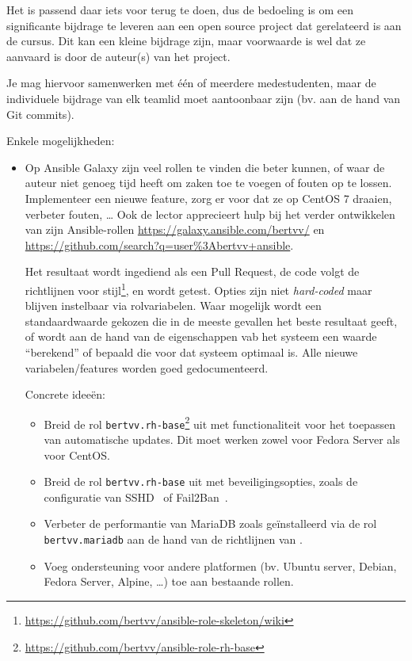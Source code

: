 Het is passend daar iets voor terug te doen, dus de bedoeling is om een significante bijdrage te leveren aan een open source project dat gerelateerd is aan de cursus. Dit kan een kleine bijdrage zijn, maar voorwaarde is wel dat ze aanvaard is door de auteur(s) van het project.

Je mag hiervoor samenwerken met één of meerdere medestudenten, maar de individuele bijdrage van elk teamlid moet aantoonbaar zijn (bv. aan de hand van Git commits).

Enkele mogelijkheden:

\begin{itemize}
\item Op Ansible Galaxy zijn veel rollen te vinden die beter kunnen, of waar de auteur niet genoeg tijd heeft om zaken toe te voegen of fouten op te lossen. Implementeer een nieuwe feature, zorg er voor dat ze op CentOS 7 draaien, verbeter fouten, \ldots{} Ook de lector apprecieert hulp bij het verder ontwikkelen van zijn Ansible-rollen \url{https://galaxy.ansible.com/bertvv/} en \url{https://github.com/search?q=user\%3Abertvv+ansible}.

  Het resultaat wordt ingediend als een Pull Request, de code volgt de richtlijnen voor stijl\footnote{\url{https://github.com/bertvv/ansible-role-skeleton/wiki}}, en wordt getest. Opties zijn niet \emph{hard-coded} maar blijven instelbaar via rolvariabelen. Waar mogelijk wordt een standaardwaarde gekozen die in de meeste gevallen het beste resultaat geeft, of wordt aan de hand van de eigenschappen vab het systeem een waarde ``berekend'' of bepaald die voor dat systeem optimaal is. Alle nieuwe variabelen/features worden goed gedocumenteerd.

  Concrete ideeën:

  \begin{itemize}
    \item Breid de rol \texttt{bertvv.rh-base}\footnote{\url{https://github.com/bertvv/ansible-role-rh-base}} uit met functionaliteit voor het toepassen van automatische updates. Dit moet werken zowel voor Fedora Server als voor CentOS.
    \item Breid de rol \texttt{bertvv.rh-base} uit met beveiligingsopties, zoals de configuratie van SSHD~\autocite{stribika2015,Moundalexis2016} of Fail2Ban~\autocite{Sawiyati2014}.
    \item Verbeter de performantie van MariaDB zoals geïnstalleerd via de rol \texttt{bertvv.mariadb} aan de hand van de richtlijnen van \textcite{Aun2016}.
    \item Voeg ondersteuning voor andere platformen (bv. Ubuntu server, Debian, Fedora Server, Alpine, \ldots) toe aan bestaande rollen.
  \end{itemize}


\end{itemize}
